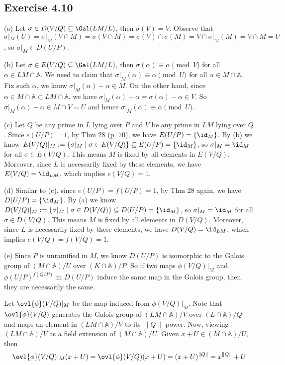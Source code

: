 \documentclass[../Chapter.tex]{subfiles}
\begin{document}
\subsection*{Exercise 4.10}

(a) Let $\sigma\in D(V/Q)\subseteq\Gal(LM/L)$, then $\sigma(V)=V$. Observe that $\sigma|_M(U)=\sigma|_M(V\cap M)=\sigma(V\cap M)=\sigma(V)\cap\sigma(M)=V\cap\sigma|_M(M)=V\cap M=U$, so $\sigma|_M\in D(U/P)$.

(b) Let $\sigma\in E(V/Q)\subseteq\Gal(LM/L)$, then $\sigma(\alpha)\equiv\alpha \pmod{V}$ for all $\alpha\in LM\cap\mathbb{A}$. We need to claim that $\sigma|_M(\alpha)\equiv\alpha\pmod{U}$ for all $\alpha\in M\cap\mathbb{A}$. Fix such $\alpha$, we know $\sigma|_M(\alpha)-\alpha\in M$. On the other hand, since $\alpha\in M\cap\mathbb{A}\subset LM\cap\mathbb{A}$, we have $\sigma|_M(\alpha)-\alpha=\sigma(\alpha)-\alpha\in V$. So $\sigma|_M(\alpha)-\alpha\in M\cap V=U$ and hence $\sigma|_M(\alpha)\equiv\alpha\pmod{U}$.

(c) Let $Q$ be any prime in $L$ lying over $P$ and $V$ be any prime in $LM$ lying over $Q$. Since $e(U/P)=1$, by Thm 28 (p. 70), we have $E(U/P)=\{\id_M\}$. By (b) we know $E(V/Q)|_M:=\{\sigma|_M \mid \sigma\in E(V/Q)\} \subseteq E(U/P)=\{\id_M\}$, so $\sigma|_M=\id_M$ for all $\sigma\in E(V/Q)$. This means $M$ is fixed by all elements in $E(V/Q)$. Moreover, since $L$ is necessarily fixed by these elements, we have $E(V/Q)=\id_{LM}$, which implies $e(V/Q)=1$.

(d) Similar to (c), since $e(U/P)=f(U/P)=1$, by Thm 28 again, we have $D(U/P)=\{\id_M\}$. By (a) we know $D(V/Q)|_M:=\{\sigma|_M \mid \sigma\in D(V/Q)\} \subseteq D(U/P)=\{\id_M\}$, so $\sigma|_M=\id_M$ for all $\sigma\in D(V/Q)$. This means $M$ is fixed by all elements in $D(V/Q)$. Moreover, since $L$ is necessarily fixed by these elements, we have $D(V/Q)=\id_{LM}$, which implies $e(V/Q)=f(V/Q)=1$.

(e) Since $P$ is unramified in $M$, we know $D(U/P)$ is isomorphic to the Galois group of $(M\cap\mathbb{A})/U$ over $(K\cap\mathbb{A})/P$. So if two maps $\phi(V/Q)|_M$ and $\phi(U/P)^{f(Q/P)}$ in $D(U/P)$ induce the same map in the Galois group, then they are necessarily the same. 

Let $\ovl{\phi}(V/Q)|_M$ be the map induced from $\phi(V/Q)|_M$. Note that $\ovl{\phi}(V/Q)$ generates the Galois group of $(LM\cap\mathbb{A})/V$ over $(L\cap\mathbb{A})/Q$ and maps an element in $(LM\cap\mathbb{A})/V$ to its $\|Q\|$ power. Now, viewing $(LM\cap\mathbb{A})/V$ as a field extension of $(M\cap\mathbb{A})/U$. Given $x+U\in(M\cap\mathbb{A})/U$, then $$\ovl{\phi}(V/Q)|_M(x+U)=\ovl{\phi}(V/Q)(x+U)=(x+U)^{\|Q\|}=x^{\|Q\|}+U$$
\end{document}
